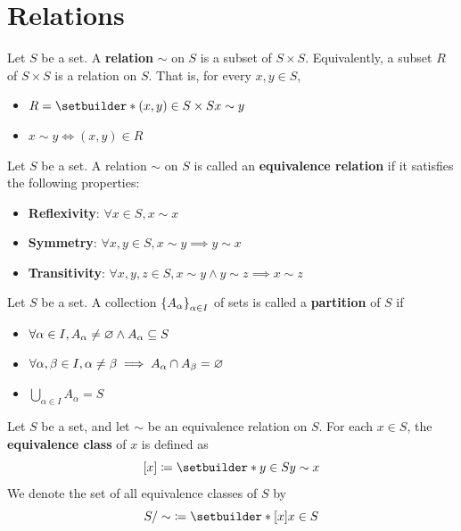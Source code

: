 \section{Relations}

Let $S$ be a set. A \textbf{relation} $\sim$ on $S$ is a subset of $S \times S$.
Equivalently, a subset $R$ of $S \times S$ is a relation on $S$. That is, for every $x, y \in S$,
\begin{itemize}
    \item $R = \setbuilder*{(x, y) \in S \times S}{x \sim y}$
    \item $x \sim y \iff (x, y) \in R$
\end{itemize}

\bigskip

\begin{definition} \label{an:def:equivalence-relation}
    Let $S$ be a set. A relation $\sim$ on $S$ is called an \textbf{equivalence relation} if it satisfies the following properties:
    \begin{itemize}
        \item \textbf{Reflexivity}: $\forall x \in S, x \sim x$
        \item \textbf{Symmetry}: $\forall x, y \in S, x \sim y \implies y \sim x$
        \item \textbf{Transitivity}: $\forall x, y, z \in S, x \sim y \land y \sim z \implies x \sim z$
    \end{itemize}
\end{definition}

\bigskip

\begin{definition} \label{an:def:partition}
    Let $S$ be a set. A collection $\set*{A_{\alpha}}_{\alpha \in I}$ of sets is called a \textbf{partition} of $S$ if
    \begin{itemize}
        \item $\forall \alpha \in I, A_{\alpha} \neq \vnot \land A_{\alpha} \subseteq S$
        \item $\forall \alpha, \beta \in I, \alpha \neq \beta \implies A_{\alpha} \cap A_{\beta} = \vnot$
        \item $\bigcup_{\alpha \in I} A_{\alpha} = S$
    \end{itemize}
\end{definition}

\bigskip

\begin{definition} \label{an:def:equivalence-class}
    Let $S$ be a set, and let $\sim$ be an equivalence relation on $S$. For each $x \in S$,
    the \textbf{equivalence class} of $x$ is defined as
    \[
    [x] \coloneqq \setbuilder*{y \in S}{y \sim x}
    \]
    We denote the set of all equivalence classes of $S$ by
    \[
    S / \sim \; \coloneqq \setbuilder*{[x]}{x \in S}
    \]
\end{definition}

